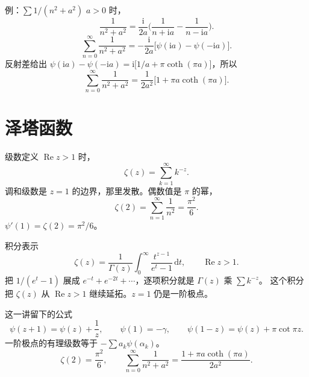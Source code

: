 \documentclass[fontset=windows, chinese, 10pt, xcolor=dvipsnames]{beamer}
\begin{document}
\begin{frame}{例：$\sum 1/(n^2+a^2)$}
  $a>0$ 时，
  \[
    \frac{1}{n^2+a^2}
    =\frac{\mathrm{i}}{2a}
      \Biggl(\frac{1}{n+\mathrm{i}a}-\frac{1}{n-\mathrm{i}a}\Biggr).
  \]
  \[
    \sum_{n=0}^{\infty}\frac{1}{n^2+a^2}
    =-\frac{\mathrm{i}}{2a}
      \bigl[\psi(\mathrm{i}a)-\psi(-\mathrm{i}a)\bigr].
  \]
  反射差给出 $\psi(\mathrm{i}a)-\psi(-\mathrm{i}a)=\mathrm{i}\bigl[1/a+\pi\coth(\pi a)\bigr]$，所以
  \begin{equation*}
    \sum_{n=0}^{\infty}\frac{1}{n^2+a^2}
    =\frac{1}{2a^2}\bigl[1+\pi a\coth(\pi a)\bigr].
  \end{equation*}
\end{frame}

\section{泽塔函数}

\begin{frame}{级数定义}
  $\operatorname{Re} z>1$ 时，
  \begin{equation*}
    \boxed{\displaystyle
      \zeta(z)=\sum_{k=1}^{\infty} k^{-z}.}
  \end{equation*}
  调和级数是 $z=1$ 的边界，那里发散。偶数值是 $\pi$ 的幂，
  \[
    \zeta(2)=\sum_{n=1}^{\infty}\frac{1}{n^2}=\frac{\pi^2}{6}.
  \]
  $\psi'(1)=\zeta(2)=\pi^2/6$。
\end{frame}

\begin{frame}{积分表示}
  \[
    \zeta(z)
    =\frac{1}{\Gamma(z)}\int_0^{\infty}\frac{t^{z-1}}{e^{t}-1}\,\mathrm{d}t,
    \qquad\operatorname{Re} z>1.
  \]
  把 $1/(e^t-1)$ 展成 $e^{-t}+e^{-2t}+\cdots$，逐项积分就是 $\Gamma(z)$ 乘 $\sum k^{-z}$。
  \vspace{0.35em}
  这个积分把 $\zeta(z)$ 从 $\operatorname{Re} z>1$ 继续延拓。$z=1$ 仍是一阶极点。
\end{frame}

\begin{frame}{这一讲留下的公式}
  \[
    \psi(z+1)=\psi(z)+\frac{1}{z},
    \qquad
    \psi(1)=-\gamma,
    \qquad
    \psi(1-z)=\psi(z)+\pi\cot\pi z.
  \]
  一阶极点的有理级数等于 $-\sum a_k\psi(\alpha_k)$。
  \[
    \zeta(2)=\frac{\pi^2}{6},
    \qquad
    \sum_{n=0}^{\infty}\frac{1}{n^2+a^2}
    =\frac{1+\pi a\coth(\pi a)}{2a^2}.
  \]
\end{frame}
\end{document}
